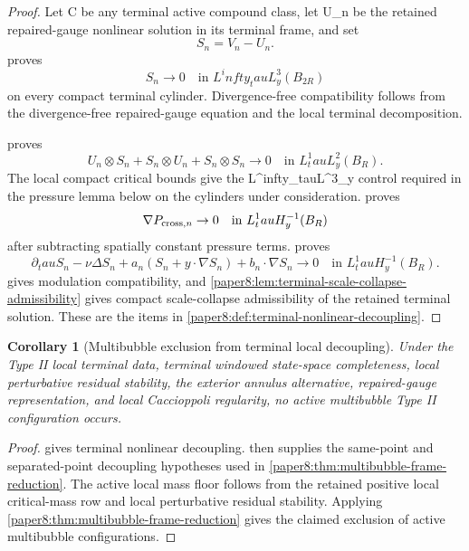 \documentclass[11pt]{amsart}
\def\({}%
\def\){}%
\def\tau{tau}%
\def\infty{infty}%
\theoremstyle{plain}
\newtheorem{corollary}[corollary]{Corollary}
\theoremstyle{definition}
\theoremstyle{remark}
\begin{document}
\begin{proof}
Let \(\mathcal C\) be any terminal active compound class, let \(U_n\) be the
retained repaired-gauge nonlinear solution in its terminal frame, and set
\[
  S_n=V_n-U_n.
\]
 proves
\[
  S_n\to0
  \quad\text{in }L^\infty_\tau L^3_y(B_{2R})
\]
on every compact terminal cylinder.  Divergence-free compatibility follows
from the divergence-free repaired-gauge equation and the local terminal
decomposition.

 proves
\[
  U_n\otimes S_n+S_n\otimes U_n+S_n\otimes S_n
  \to0
  \quad\text{in }L^1_\tau L^2_y(B_R).
\]
The local compact critical bounds give the \(L^\infty_\tau L^3_y\) control
required in the pressure lemma below on the cylinders under consideration.
 proves
\[
  \nabla P_{{\rm cross},n}\to0
  \quad\text{in }L^1_\tau H^{-1}_y(B_R)
\]
after subtracting spatially constant pressure terms.  
proves
\[
  \partial_\tau S_n-\nu\Delta S_n
  +a_n(S_n+y\cdot\nabla S_n)
  +b_n\cdot\nabla S_n
  \to0
  \quad\text{in }L^1_\tau H^{-1}_y(B_R).
\]
 gives modulation
compatibility, and \cref{paper8:lem:terminal-scale-collapse-admissibility}
gives compact scale-collapse admissibility of the retained terminal solution.
These are the items in \cref{paper8:def:terminal-nonlinear-decoupling}.
\end{proof}

\begin{corollary}[Multibubble exclusion from terminal local decoupling]
\label{paper8:cor:multibubble-exclusion-terminal}
Under the Type II local terminal data, terminal windowed state-space
completeness, local perturbative residual stability, the exterior annulus
alternative, repaired-gauge representation, and local Caccioppoli regularity,
no active multibubble Type II configuration occurs.
\end{corollary}

\begin{proof}
 gives terminal nonlinear
decoupling.  
then supplies the same-point and separated-point decoupling hypotheses used in
\cref{paper8:thm:multibubble-frame-reduction}.  The active local mass floor
follows from the retained positive local critical-mass row and local
perturbative residual stability.  Applying
\cref{paper8:thm:multibubble-frame-reduction} gives the claimed exclusion of
active multibubble configurations.
\end{proof}
\end{document}
